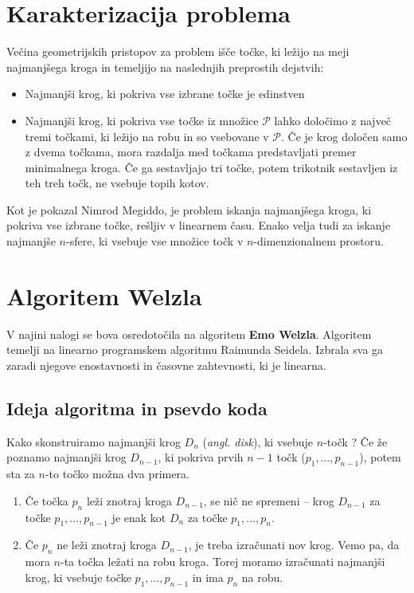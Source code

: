\documentclass[a4paper]{article}
\begin{document}
\newpage
\section{Karakterizacija problema}

Večina geometrijskih pristopov za problem išče točke, ki ležijo na meji
najmanjšega kroga in temeljijo na naslednjih preprostih dejstvih:
\begin{itemize}
\item Najmanjši krog, ki pokriva vse izbrane točke je edinstven
\item Najmanjši krog, ki pokriva vse točke iz množice $\mathcal{P}$ lahko določimo z
največ tremi točkami, ki ležijo na robu in so vsebovane v $\mathcal{P}$. Če je
krog določen samo z dvema točkama, mora razdalja med točkama
predstavljati premer minimalnega kroga. Če ga sestavljajo tri
točke, potem trikotnik sestavljen iz teh treh točk, ne vsebuje
topih kotov.
\end{itemize}

Kot je pokazal Nimrod Megiddo, je problem iskanja najmanjšega kroga, ki
pokriva vse izbrane točke, rešljiv v linearnem času. Enako velja tudi za
iskanje najmanjše $n$-sfere, ki vsebuje vse množice točk v $n$-dimenzionalnem
prostoru.

\section{Algoritem Welzla}

V najini nalogi se bova osredotočila na algoritem \textbf{Emo Welzla}. Algoritem temelji na linearno programskem algoritmu Raimunda Seidela. Izbrala sva ga zaradi njegove enostavnosti in časovne zahtevnosti, ki je linearna.

\subsection{Ideja algoritma in psevdo koda}

Kako skonstruiramo najmanjši krog $D_n$  (\textit{angl. disk}), ki vsebuje $n$-točk ?
\newline Če že poznamo najmanjši krog $D_{n-1}$, ki pokriva  prvih $n-1$ točk ($p_1 ,…,p_{n-1}$), potem sta za $n$-to točko možna dva primera.

\begin{enumerate}
\item Če točka $p_n$ leži znotraj kroga $D_{n-1}$, se nič ne spremeni –  krog $D_{n-1}$ za točke $p_1 ,…,p_{n-1}$ je enak kot $D_n$ za točke $p_1,...,p_n$.
\item  Če $p_n$ ne leži znotraj kroga $D_{n-1}$, je treba izračunati nov krog. Vemo pa, da mora $n$-ta točka ležati na robu kroga. Torej moramo izračunati najmanjši krog, ki vsebuje točke $p_1 ,…,p_{n-1}$ in ima $p_n$ na robu.
\end{enumerate}
\end{document}
